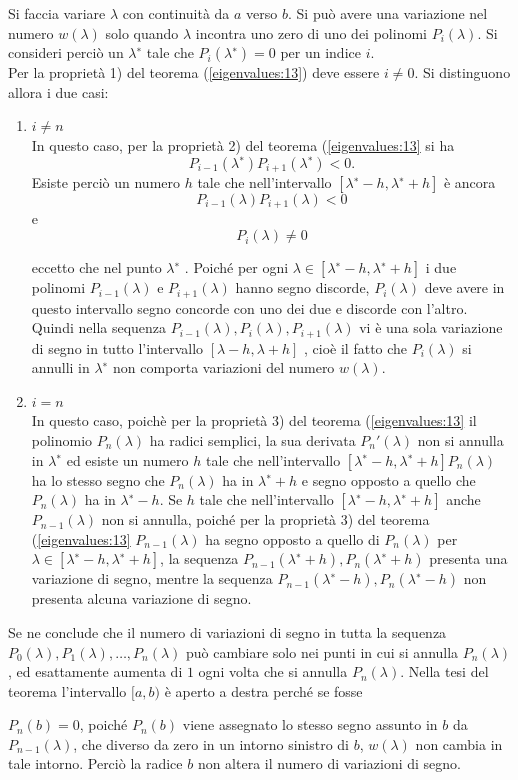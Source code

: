 \begin{thproof}
 Si faccia variare $\lambda$ con continuit\`a da $a$ verso $b$.
Si pu\`o avere una variazione nel numero $w(\lambda)$ solo quando
$\lambda$ incontra uno zero di uno dei
polinomi $P_i (\lambda)$.
Si consideri perci\`o un $\lambda^∗$ tale che $P_i (\lambda^∗ ) = 0$
 per un indice $i$. \\
 Per la propriet\`a 1) del teorema (\ref{eigenvalues:13}) deve essere $i \neq 0$.
Si distinguono allora i due casi:
\begin{enumerate}
\item $i\neq n$ \\
In questo caso, per la propriet\`a 2) del teorema
(\ref{eigenvalues:13}  si ha
$$P_{i−1} (\lambda^∗ )P_{i+1} (\lambda^∗ ) < 0.$$
Esiste perci\`o un numero $h$ tale che nell’intervallo
$[\lambda^∗ − h, \lambda^∗ + h]$
\`e ancora
$$P_{i−1} (\lambda)P_{i+1} (\lambda) < 0$$
e
$$
P_i(\lambda) \neq 0
$$

 eccetto che nel punto $\lambda^∗$ . Poich\'e per ogni
 $\lambda \in [\lambda^∗ − h, \lambda^∗ + h]$ i due
  polinomi $P_{i−1} (\lambda)$ e $P_{i+1} (\lambda)$
  hanno segno discorde, $P_i(\lambda)$ deve avere in
 questo intervallo segno concorde con uno dei due e discorde con
l’altro.
Quindi nella sequenza $P_{i−1} (\lambda), P_i (\lambda), P_{i+1} (\lambda)$
 vi \`e una sola variazione
 di segno in tutto l’intervallo $[\lambda − h, \lambda + h]$
, cio\`e il fatto che $P_i (\lambda)$ si
 annulli in $\lambda^∗$ non comporta variazioni del numero
$w(\lambda)$.

\item $i = n$\\
 In questo caso, poich\`e per la propriet\`a 3) del teorema (\ref{eigenvalues:13} il
 polinomio $P_n(\lambda)$ ha radici semplici,
la sua derivata $P_n' (\lambda)$ non si annulla
in $\lambda^∗$ ed esiste un numero $h$ tale che nell’intervallo
$[\lambda^∗ -h, \lambda^∗ +h]P_n (\lambda)$
 ha lo stesso segno che $P_n (\lambda)$ ha in
$\lambda^∗ + h$ e segno opposto a quello che
 $P_n (\lambda)$ ha in $\lambda^∗ - h$.
Se $h$ tale che nell’intervallo $[\lambda^∗ − h, \lambda^∗ + h]$
 anche
 $P_{n−1} (\lambda)$ non si annulla, poich\'e per la propriet\`a 3)
 del teorema (\ref{eigenvalues:13}
 $P_{n−1} (\lambda)$ ha segno opposto a quello di
$P_n (\lambda)$ per $\lambda \in [\lambda^∗ − h, \lambda^∗ + h]$,
 la  sequenza $P_{n−1} (\lambda^∗ + h), P_n (\lambda^∗ + h)$
 presenta una variazione di segno,
 mentre la sequenza $P_{n−1} (\lambda^∗ - h), P_n (\lambda^∗ - h)$
 non presenta alcuna variazione di segno.
\end{enumerate}
Se ne conclude che il numero di variazioni di segno in tutta la
sequenza $P_0 (\lambda), P_1 (\lambda), \ldots , P_n (\lambda)$ pu\`o
cambiare solo nei punti in cui si annulla $P_n (\lambda)$, ed
esattamente aumenta di $1$ ogni volta che si annulla $P_n (\lambda)$.
Nella tesi del teorema l’intervallo $[a, b)$ \`e aperto a destra
perch\'e se fosse

$P_n (b) = 0$, poich\'e $P_n(b)$ viene assegnato lo stesso segno
assunto in $b$ da $P_{n−1} (\lambda)$, che diverso da zero in un
intorno sinistro di $b$, $w(\lambda)$ non cambia in tale
intorno. Perci\`o la radice $b$ non altera il numero di variazioni di
segno.
\end{thproof}
